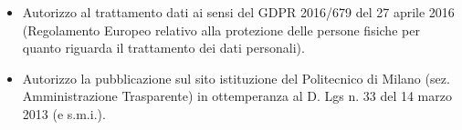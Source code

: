 \begin{itemize}
\item Autorizzo al trattamento dati ai sensi del GDPR 2016/679 del 27 aprile 2016 (Regolamento Europeo relativo alla protezione delle persone fisiche per quanto riguarda il trattamento dei dati personali).
\item Autorizzo la pubblicazione sul sito istituzione del Politecnico di Milano (sez. Amministrazione Trasparente) in ottemperanza al D. Lgs n. 33 del 14 marzo 2013 (e s.m.i.).
\end{itemize}
